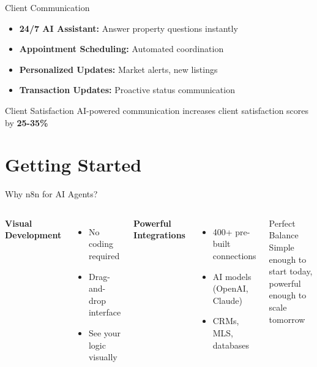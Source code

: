 \documentclass{beamer}
\begin{document}
\begin{frame}{Client Communication}
  \begin{itemize}
    \item \textbf{24/7 AI Assistant:} Answer property questions instantly
    \item \textbf{Appointment Scheduling:} Automated coordination
    \item \textbf{Personalized Updates:} Market alerts, new listings
    \item \textbf{Transaction Updates:} Proactive status communication
  \end{itemize}
  
  \vspace{0.5cm}
  
  \begin{block}{Client Satisfaction}
    AI-powered communication increases client satisfaction scores by \textbf{25-35\%}
  \end{block}
\end{frame}

\section{Getting Started}

\begin{frame}{Why n8n for AI Agents?}
  \begin{columns}[onlytextwidth]
      \textbf{Visual Development}
      \begin{itemize}
        \item No coding required
        \item Drag-and-drop interface
        \item See your logic visually
      \end{itemize}
      
      \textbf{Powerful Integrations}
      \begin{itemize}
        \item 400+ pre-built connections
        \item AI models (OpenAI, Claude)
        \item CRMs, MLS, databases
      \end{itemize}
    
      \begin{block}{Perfect Balance}
        Simple enough to start today, powerful enough to scale tomorrow
      \end{block}
  \end{columns}
\end{frame}
\end{document}
